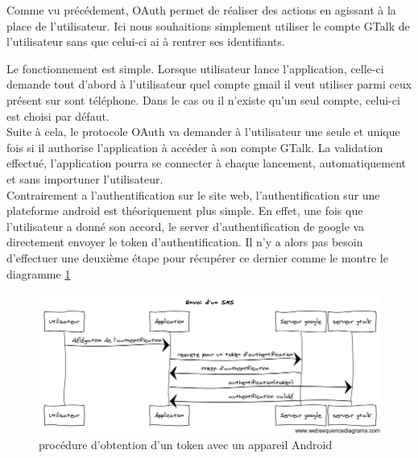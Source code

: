 Comme vu précédement, OAuth permet de réaliser des actions en agissant à la place de l'utilisateur. 
Ici nous souhaitions simplement utiliser le compte GTalk de l'utilisateur sans que celui-ci ai à rentrer
ses identifiants. 

Le fonctionnement est simple. Lorsque utilisateur lance l'application, celle-ci demande tout d'abord
à l'utilisateur quel compte gmail il veut utiliser parmi ceux présent sur sont téléphone. Dans le cas
ou il n'existe qu'un seul compte, celui-ci est choisi par défaut.
\\


Suite à cela, le protocole OAuth va demander à l'utilisateur une seule et unique fois si il authorise 
l'application à accéder à son compte GTalk. La validation effectué, l'application pourra se connecter 
à chaque lancement, automatiquement et sans importuner l'utilisateur. 
\\


Contrairement a l'authentification sur le site web, l'authentification sur une plateforme android est
théoriquement plus simple. En effet, une fois que l'utilisateur a donné son accord, le server 
d'authentification de google va directement envoyer le token d'authentification. Il n'y a alors pas 
besoin d'effectuer une deuxième étape pour récupérer ce dernier comme le montre le diagramme 
\ref{obtention-token-avec-android}



\begin{figure}[!h]
	\center
	\includegraphics[width=15cm]{img/obtention-token-avec-android.png}
	\caption{procédure d'obtention d'un token avec un appareil Android}
	\label{obtention-token-avec-android}
\end{figure}

